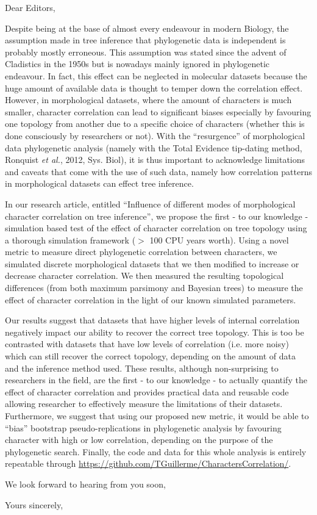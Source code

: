 \documentclass[11pt]{letter}
\begin{document}
\begin{letter}{}
\opening{Dear Editors,}

Despite being at the base of almost every endeavour in modern Biology, the assumption made in tree inference that phylogenetic data is independent is probably mostly erroneous.
This assumption was stated since the advent of Cladistics in the 1950s but is nowadays mainly ignored in phylogenetic endeavour.
In fact, this effect can be neglected in molecular datasets because the huge amount of available data is thought to temper down the correlation effect.
However, in morphological datasets, where the amount of characters is much smaller, character correlation can lead to significant biases especially by favouring one topology from another due to a specific choice of characters (whether this is done consciously by researchers or not).
With the ``resurgence'' of morphological data phylogenetic analysis (namely with the Total Evidence tip-dating method, Ronquist \textit{et al.}, 2012, Sys. Biol), it is thus important to acknowledge limitations and caveats that come with the use of such data, namely how correlation patterns in morphological datasets can effect tree inference.

In our research article, entitled ``Influence of different modes of morphological character correlation on tree inference'', we propose the first - to our knowledge - simulation based test of the effect of character correlation on tree topology using a thorough simulation framework ($>$ 100 CPU years worth).
Using a novel metric to measure direct phylogenetic correlation between characters, we simulated discrete morphological datasets that we then modified to increase or decrease character correlation.
We then measured the resulting topological differences (from both maximum parsimony and Bayesian trees) to measure the effect of character correlation in the light of our known simulated parameters.

Our results suggest that datasets that have higher levels of internal correlation negatively impact our ability to recover the correct tree topology.
This is too be contrasted with datasets that have low levels of correlation (i.e. more noisy) which can still recover the correct topology, depending on the amount of data and the inference method used.
These results, although non-surprising to researchers in the field, are the first - to our knowledge - to actually quantify the effect of character correlation and provides practical data and reusable code allowing researcher to effectively measure the limitations of their datasets.
Furthermore, we suggest that using our proposed new metric, it would be able to ``bias'' bootstrap pseudo-replications in phylogenetic analysis by favouring character with high or low correlation, depending on the purpose of the phylogenetic search.
Finally, the code and data for this whole analysis is entirely repeatable through \url{https://github.com/TGuillerme/CharactersCorrelation/}.

We look forward to hearing from you soon,

\closing{Yours sincerely,}


\end{letter}
\end{document}
